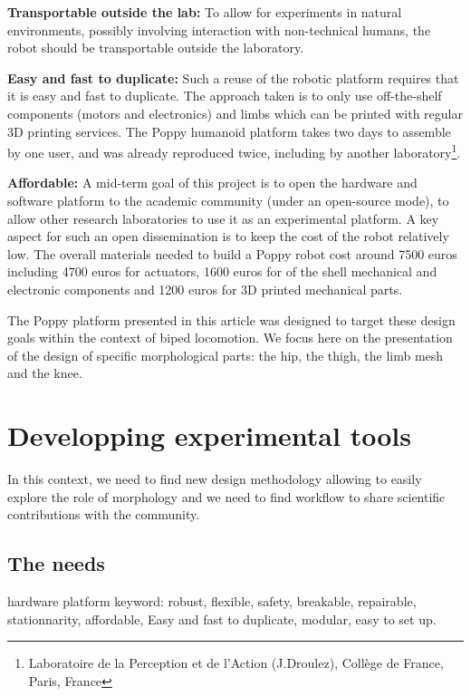\textbf{Transportable outside the lab:} To allow for experiments in natural environments, possibly involving interaction with non-technical humans, the robot should be transportable outside the laboratory.

\textbf{Easy and fast to duplicate:} Such a reuse of the robotic platform requires that it is easy and fast to duplicate.
The approach taken is to only use off-the-shelf components (motors and electronics) and limbs which can be printed with regular 3D printing services.
The Poppy humanoid platform takes two days to assemble by one user, and was already reproduced twice, including by another laboratory\footnote{Laboratoire de la Perception et de l'Action (J.Droulez), Collège de France, Paris, France\label{LPPA}}.

\textbf{Affordable:} A mid-term goal of this project is to open the hardware and software platform to the academic community (under an open-source mode), to allow other research laboratories to use it as an experimental platform.
A key aspect for such an open dissemination is to keep the cost of the robot relatively low.
The overall materials needed to build a Poppy robot cost around 7500 euros including 4700 euros for actuators, 1600 euros for of the shell mechanical and electronic components and 1200 euros for 3D printed mechanical parts.


The Poppy platform presented in this article was designed to target these design goals within the context of biped locomotion.
We focus here on the presentation of the design of specific morphological parts: the hip, the thigh, the limb mesh and the knee.





\section{Developping experimental tools}

In this context, we need to find new design methodology allowing to easily explore the role of morphology and we need to find workflow to share scientific contributions with the community.

\subsection{The needs}
hardware platform keyword: robust, flexible, safety, breakable, repairable, stationnarity, affordable, Easy and fast to duplicate, modular, easy to set up.


